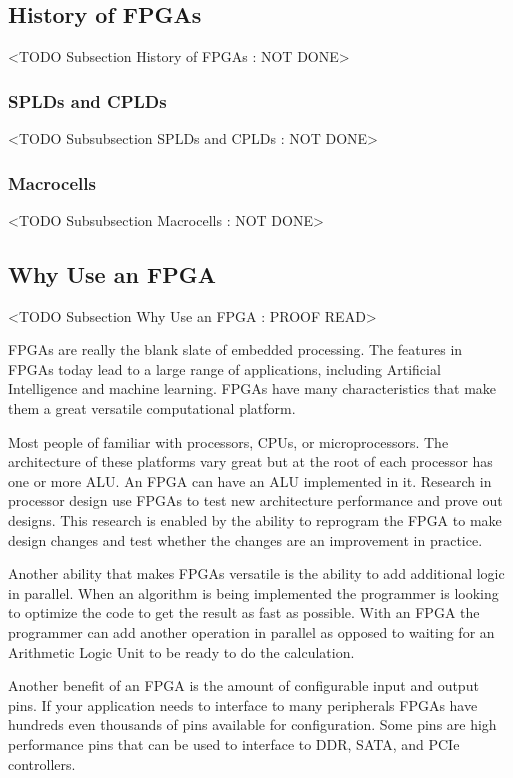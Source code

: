 \subsection{History of FPGAs}
	<TODO Subsection History of FPGAs : NOT DONE>

\subsubsection{SPLDs and CPLDs}
	<TODO Subsubsection  SPLDs and CPLDs : NOT DONE>

\subsubsection{Macrocells}
	<TODO Subsubsection  Macrocells : NOT DONE>

\subsection{Why Use an FPGA}
	<TODO Subsection Why Use an FPGA : PROOF READ>
	
FPGAs are really the blank slate of embedded processing. The features in FPGAs today lead to a large range of applications, including Artificial Intelligence and machine learning. FPGAs have many characteristics that make them a great versatile computational platform. 

Most people of familiar with processors, CPUs, or microprocessors. The architecture of these platforms vary great but at the root of each processor has one or more ALU. An FPGA can have an ALU implemented in it. Research in processor design use FPGAs to test new architecture performance and prove out designs. This research is enabled by the ability to reprogram the FPGA to make design changes and test whether the changes are an improvement in practice. 

Another ability that makes FPGAs versatile is the ability to add additional logic in parallel. When an algorithm is being implemented the programmer is looking to optimize the code to get the result as fast as possible. With an FPGA the programmer can add another operation in parallel as opposed to waiting for an Arithmetic Logic Unit to be ready to do the calculation. 

Another benefit of an FPGA is the amount of configurable input and output pins. If your application needs to interface to many peripherals FPGAs have hundreds even thousands of pins available for configuration. Some pins are high performance pins that can be used to interface to DDR, SATA, and PCIe controllers. 

